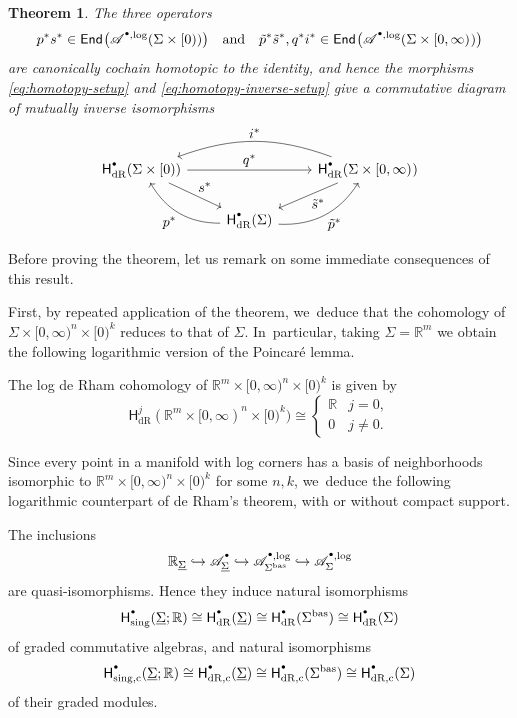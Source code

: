 \documentclass[10pt]{amsart}
\let\oldbullet\bullet
\renewcommand{\bullet}{{\raisebox{1pt}{$\scriptscriptstyle\oldbullet$}}}
\let\tst\textstyle
\newcommand\hto{\mathrel{\lhook\joinrel\to}}
\newcommand{\rbirac}[1]{\bigl(#1\bigr)}
\newcommand{\bEnd}[2][]{\mathsf{End}_{#1}\rbirac{#2}}
\newtheorem{theorem}{Theorem}[section]
\theoremstyle{definition}
\theoremstyle{remark}
\newcommand{\RR}{\mathbb{R}}
\newcommand{\model}[2]{\halfspc{#1}\times[0)^{#2}}
\newcommand{\halfspc}[1]{[0,\infty)^{#1}}
\newcommand{\tp}{\tilde p}
\newcommand{\ts}{\tilde s}
\newcommand{\rbrac}[1]{\left(#1\right)}
\newcommand{\cA}[2][\bullet]{\mathscr{A}^{#1}_{#2}}\newcommand{\A}[2][\bullet] {\mathscr{A}^{#1}\rbrac{#2}}
\newcommand{\cAlog}[2][\bullet]{\mathscr{A}^{#1,\log}_{#2}}
\newcommand{\Sig}{\Sigma}
\newcommand{\uSig}{\underline{\Sigma}}
\newcommand{\bas}[1]{{#1}^{\mathrm{bas}}}
\newcommand{\Sigbas}{\bas{\Sig}}
\newcommand{\HdR}[2][\bullet]{\mathsf{H}_{\mathrm{dR}}^{#1}(#2)}
\newcommand{\HdRc}[2][\bullet]{\mathsf{H}_{\mathrm{dR},\mathrm{c}}^{#1}(#2)}
\begin{document}
\begin{theorem}\label{thm:deRham-homotopy}
The three operators\vspace*{-3pt}
\[
p^*s^* \in \bEnd{\cAlog{}(\Sig\times [0))}
\quad
\text{and}
\quad
\tp^*\ts^*,q^* i^* \in \bEnd{\cAlog{}(\Sig\times\halfspc{})}
\]
are canonically cochain homotopic to the identity, and hence the morphisms \eqref{eq:homotopy-setup} and \eqref{eq:homotopy-inverse-setup} give a commutative diagram of mutually inverse isomorphisms\vspace*{-3pt}
\[
\begin{tikzcd}
\HdR{\Sig \times [0)}\ar[rr,"\tst q^*"]\ar[dr,"\tst s^*"] & &\HdR{\Sig\times \halfspc{}} \ar[ll,bend right=20,"\tst i^*"'] \ar[dl,"\tst \ts^*"]\\
& \HdR{\Sig} \ar[ul,"\tst p^*",bend left = 30] \ar[ur,"\tst \tp^*"',bend right = 30]
\end{tikzcd}
\]
\end{theorem}
Before proving the theorem, let us remark on some immediate consequences of this result.

First, by repeated application of the theorem, we~deduce that the cohomology of $\Sig \times \model{n}{k}$ reduces to that of $\Sig$. In~particular, taking $\Sig = \RR^m$ we obtain the following logarithmic version of the Poincaré lemma.
\begin{corollary}
The log de Rham cohomology of $\RR^m \times \model{n}{k}$ is given by
\[
\HdR[j]{\RR^m\times \model{n}{k}} \cong \begin{cases}
\RR & j=0, \\
0 & j \neq 0.
\end{cases}
\]
\end{corollary}

Since every point in a manifold with log corners has a basis of neighborhoods isomorphic to $\RR^m\times\model{n}{k}$ for some $n,k$, we~deduce the following logarithmic counterpart of de Rham's theorem, with or without compact support.

\begin{corollary}\label{cor:log-de-Rham}
The inclusions
\[
\RR_{\uSig} \hto \cA{\uSig} \hto \cAlog{\Sigbas} \hto \cAlog{\Sig}
\]
are quasi-isomorphisms. Hence they induce natural isomorphisms
\[
\mathsf{H}^\bullet_{\mathrm{sing}}(\uSig;\RR) \cong \HdR{\uSig} \cong \HdR{\Sigbas} \cong \HdR{\Sig}
\]
of graded commutative algebras, and natural isomorphisms
\[
\mathsf{H}^\bullet_{\mathrm{sing,c}}(\uSig;\RR)\cong \HdRc{\uSig} \cong \HdRc{\Sigbas} \cong \HdRc{\Sig}
\]
of their graded modules.
\end{corollary}
\end{document}
